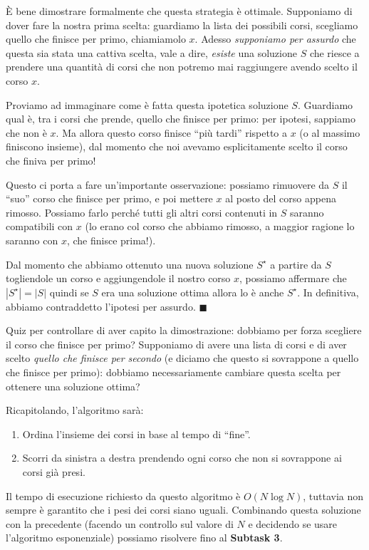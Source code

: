 \begin{warning}
È bene dimostrare formalmente che questa strategia è ottimale. Supponiamo di dover fare la nostra prima scelta: guardiamo la lista dei possibili corsi, scegliamo quello che finisce per primo, chiamiamolo $x$. Adesso \textit{supponiamo per assurdo} che questa sia stata una cattiva scelta, vale a dire, \textit{esiste} una soluzione $S$ che riesce a prendere una quantità di corsi che non potremo mai raggiungere avendo scelto il corso $x$.

Proviamo ad immaginare come è fatta questa ipotetica soluzione $S$. Guardiamo qual è, tra i corsi che prende, quello che finisce per primo: per ipotesi, sappiamo che non è $x$. Ma allora questo corso finisce ``più tardi'' rispetto a $x$ (o al massimo finiscono insieme), dal momento che noi avevamo esplicitamente scelto il corso che finiva per primo!

Questo ci porta a fare un'importante osservazione: possiamo rimuovere da $S$ il ``suo'' corso che finisce per primo, e poi mettere $x$ al posto del corso appena rimosso. Possiamo farlo perché tutti gli altri corsi contenuti in $S$ saranno compatibili con $x$ (lo erano col corso che abbiamo rimosso, a maggior ragione lo saranno con $x$, che finisce prima!).

Dal momento che abbiamo ottenuto una nuova soluzione $S^\star$ a partire da $S$ togliendole un corso e aggiungendole il nostro corso $x$, possiamo affermare che $|S^\star| = |S|$ quindi se $S$ era una soluzione ottima allora lo è anche $S^\star$. In definitiva, abbiamo contraddetto l'ipotesi per assurdo. $\blacksquare$

Quiz per controllare di aver capito la dimostrazione: dobbiamo per forza scegliere il corso che finisce per primo? Supponiamo di avere una lista di corsi e di aver scelto \textit{quello che finisce per secondo} (e diciamo che questo si sovrappone a quello che finisce per primo): dobbiamo necessariamente cambiare questa scelta per ottenere una soluzione ottima?
\end{warning}

Ricapitolando, l'algoritmo sarà:
\begin{enumerate}
\item Ordina l'insieme dei corsi in base al tempo di ``fine''.
\item Scorri da sinistra a destra prendendo ogni corso che non si sovrappone ai corsi già presi.
\end{enumerate}

Il tempo di esecuzione richiesto da questo algoritmo è $O(N \log N)$, tuttavia non sempre è garantito che i pesi dei corsi siano uguali. Combinando questa soluzione con la precedente (facendo un controllo sul valore di $N$ e decidendo se usare l'algoritmo esponenziale) possiamo risolvere fino al \textbf{Subtask 3}.

